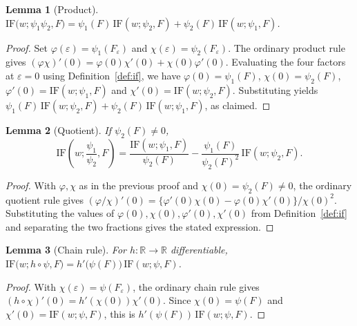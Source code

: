 \documentclass[11pt]{article}
\theoremstyle{plain}
\newtheorem{lem}{Lemma}
\theoremstyle{definition}
\theoremstyle{remark}
\newcommand{\R}{\mathbb{R}}
\newcommand{\IF}{\mathrm{IF}}
\begin{document}
\begin{lem}[Product]
\label{lem:product}
$\IF\big(w;\psi_1\psi_2,F\big)
= \psi_1(F)\,\IF(w;\psi_2,F) + \psi_2(F)\,\IF(w;\psi_1,F)$.
\end{lem}
\begin{proof}
Set $\varphi(\varepsilon) = \psi_1(F_\varepsilon)$ and
$\chi(\varepsilon) = \psi_2(F_\varepsilon)$. The ordinary product rule gives
$(\varphi\chi)'(0) = \varphi(0)\chi'(0) + \chi(0)\varphi'(0)$. Evaluating the four factors at
$\varepsilon = 0$ using Definition~\ref{def:if}, we have $\varphi(0) = \psi_1(F)$,
$\chi(0) = \psi_2(F)$, $\varphi'(0) = \IF(w;\psi_1,F)$ and $\chi'(0) = \IF(w;\psi_2,F)$.
Substituting yields
$\psi_1(F)\,\IF(w;\psi_2,F) + \psi_2(F)\,\IF(w;\psi_1,F)$, as claimed.
\end{proof}

\begin{lem}[Quotient]
\label{lem:quotient}
If $\psi_2(F) \neq 0$,
\[
\IF\!\left(w;\frac{\psi_1}{\psi_2},F\right)
= \frac{\IF(w;\psi_1,F)}{\psi_2(F)}
- \frac{\psi_1(F)}{\psi_2(F)^2}\,\IF(w;\psi_2,F).
\]
\end{lem}
\begin{proof}
With $\varphi,\chi$ as in the previous proof and $\chi(0) = \psi_2(F) \neq 0$, the ordinary
quotient rule gives $(\varphi/\chi)'(0) = \{\varphi'(0)\chi(0) - \varphi(0)\chi'(0)\}/\chi(0)^2$.
Substituting the values of $\varphi(0),\chi(0),\varphi'(0),\chi'(0)$ from Definition~\ref{def:if}
and separating the two fractions gives the stated expression.
\end{proof}

\begin{lem}[Chain rule]
\label{lem:chain}
For $h : \R \to \R$ differentiable,
$\IF\big(w;h \circ \psi,F\big) = h'\big(\psi(F)\big)\,\IF(w;\psi,F)$.
\end{lem}
\begin{proof}
With $\chi(\varepsilon) = \psi(F_\varepsilon)$, the ordinary chain rule gives
$(h\circ\chi)'(0) = h'(\chi(0))\chi'(0)$. Since $\chi(0) = \psi(F)$ and
$\chi'(0) = \IF(w;\psi,F)$, this is $h'(\psi(F))\,\IF(w;\psi,F)$.
\end{proof}
\end{document}
